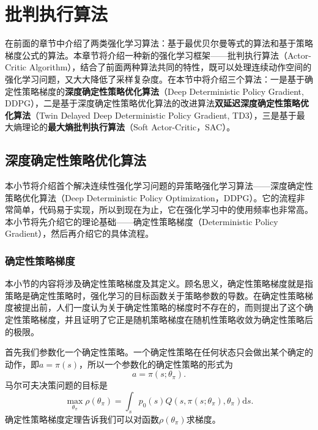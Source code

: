 \section{批判执行算法}

在前面的章节中介绍了两类强化学习算法：基于最优贝尔曼等式的算法和基于策略梯度公式的算法。本章节将介绍一种新的强化学习框架——批判执行算法（Actor-Critic Algorithm），结合了前面两种算法共同的特性，既可以处理连续动作空间的强化学习问题，又大大降低了采样复杂度。在本节中将介绍三个算法：一是基于确定性策略梯度的\textbf{深度确定性策略优化算法}\cite{christiano2017deep}（Deep Deterministic Policy Gradient, DDPG），二是基于深度确定性策略优化算法的改进算法\textbf{双延迟深度确定性策略优化算法}\cite{fujimoto2018addressing}（Twin Delayed Deep Deterministic Policy Gradient, TD3），三是基于最大熵理论的\textbf{最大熵批判执行算法}\cite{haarnoja2018soft}（Soft Actor-Critic，SAC）。

\subsection{深度确定性策略优化算法}

本小节将介绍首个解决连续性强化学习问题的异策略强化学习算法——深度确定性策略优化算法\cite{christiano2017deep}（Deep Deterministic Policy Optimization，DDPG）。它的流程非常简单，代码易于实现，所以到现在为止，它在强化学习中的使用频率也非常高。本小节将先介绍它的理论基础——确定性策略梯度\cite{silver2014deterministic}（Deterministic Policy Gradient），然后再介绍它的具体流程。

\subsubsection{确定性策略梯度}

本小节的内容将涉及确定性策略梯度及其定义。顾名思义，确定性策略梯度就是指策略是确定性策略时，强化学习的目标函数关于策略参数的导数。在确定性策略梯度被提出前，人们一度认为关于确定性策略的梯度时不存在的，而\cite{silver2014deterministic}则提出了这个确定性策略梯度，并且证明了它正是随机策略梯度在随机性策略收敛为确定性策略后的极限。

首先我们参数化一个确定性策略。一个确定性策略在任何状态只会做出某个确定的动作，即$a = \pi(s)$，所以一个参数化的确定性策略的形式为
\begin{equation}
    a = \pi(s; \theta_\pi).
\end{equation}
马尔可夫决策问题的目标是
\begin{equation}
    \max_{\theta_\pi} \rho(\theta_\pi) = \int_s p_0(s) Q(s, \pi(s;\theta_\pi), \theta_\pi)\mathrm{d} s.
\end{equation}
确定性策略梯度定理告诉我们可以对函数$\rho(\theta_\pi)$求梯度。

